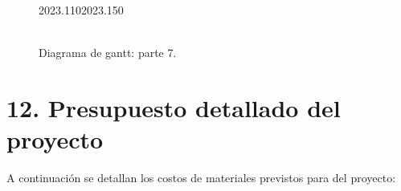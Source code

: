 \documentclass[
11pt, %
]{charter}
\begin{document}
\begin{landscape}
	
	\begin{figure}[htbp]
		\begin{center}
			\begin{ganttchart}[
				hgrid,
				vgrid,
				time slot format=stardate
				]{2023.110}{2023.150}
				 \\
				 \\
				 \ganttnewline

			\end{ganttchart}
		\end{center}
		\caption{Diagrama de gantt: parte 7.}
		\label{fig:gantt7}
	\end{figure}
	
\end{landscape}

\section{12. Presupuesto detallado del proyecto}
\label{sec:presupuesto}

A continuación se detallan los costos de materiales previstos para del proyecto:
\end{document}

